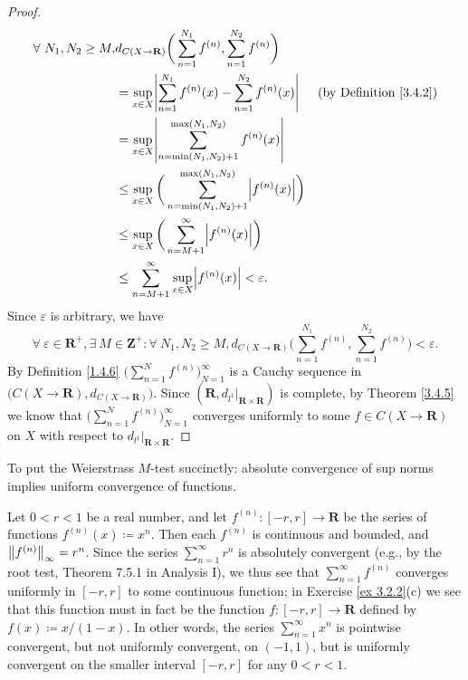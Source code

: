 \begin{proof}
\begin{align*}
        \forall\ N_1, N_2 \geq M, & d_{C(X \to \mathbf{R})}\bigg(\sum_{n = 1}^{N_1} f^{(n)}, \sum_{n = 1}^{N_2} f^{(n)}\bigg)                                             \\
                                  & = \sup_{x \in X} \abs*{\sum_{n = 1}^{N_1} f^{(n)}(x) - \sum_{n = 1}^{N_2} f^{(n)}(x)}            & \text{(by Definition \ref{3.4.2})} \\
                                  & = \sup_{x \in X} \abs*{\sum_{n = \min(N_1, N_2) + 1}^{\max(N_1, N_2)} f^{(n)}(x)}                                                     \\
                                  & \leq \sup_{x \in X} \bigg(\sum_{n = \min(N_1, N_2) + 1}^{\max(N_1, N_2)} \abs*{f^{(n)}(x)}\bigg)                                      \\
                                  & \leq \sup_{x \in X} \bigg(\sum_{n = M + 1}^\infty \abs*{f^{(n)}(x)}\bigg)                                                             \\
                                  & \leq \sum_{n = M + 1}^\infty \sup_{x \in X} \abs*{f^{(n)}(x)} < \varepsilon.
    \end{align*}
    Since \(\varepsilon\) is arbitrary, we have
    \[
        \forall\ \varepsilon \in \mathbf{R}^+, \exists\ M \in \mathbf{Z}^+ : \forall\ N_1, N_2 \geq M, d_{C(X \to \mathbf{R})}\bigg(\sum_{n = 1}^{N_1} f^{(n)}, \sum_{n = 1}^{N_2} f^{(n)}\bigg) < \varepsilon.
    \]
    By Definition \ref{1.4.6} \(\bigg(\sum_{n = 1}^N f^{(n)}\bigg)_{N = 1}^\infty\) is a Cauchy sequence in \(\big(C(X \to \mathbf{R}), d_{C(X \to \mathbf{R})}\big)\).
    Since \((\mathbf{R}, d_{l^1}|_{\mathbf{R} \times \mathbf{R}})\) is complete, by Theorem \ref{3.4.5} we know that \(\bigg(\sum_{n = 1}^N f^{(n)}\bigg)_{N = 1}^\infty\) converges uniformly to some \(f \in C(X \to \mathbf{R})\) on \(X\) with respect to \(d_{l^1}|_{\mathbf{R} \times \mathbf{R}}\).
\end{proof}

\begin{note}
    To put the Weierstrass \(M\)-test succinctly:
    absolute convergence of sup norms implies uniform convergence of functions.
\end{note}

\begin{example}\label{3.5.8}
    Let \(0 < r < 1\) be a real number, and let \(f^{(n)} : [-r, r] \to \mathbf{R}\) be the series of functions \(f^{(n)}(x) \coloneqq x^n\).
    Then each \(f^{(n)}\) is continuous and bounded, and \(\norm*{f^{(n)}}_\infty = r^n\).
    Since the series \(\sum_{n = 1}^\infty r^n\) is absolutely convergent (e.g., by the root test, Theorem 7.5.1 in Analysis I), we thus see that \(\sum_{n = 1}^\infty f^{(n)}\) converges uniformly in \([-r, r]\) to some continuous function;
    in Exercise \ref{ex 3.2.2}(c) we see that this function must in fact be the function \(f : [-r, r] \to \mathbf{R}\) defined by \(f(x) \coloneqq x / (1 - x)\).
    In other words, the series \(\sum_{n = 1}^\infty x^n\) is pointwise convergent, but not uniformly convergent, on \((-1, 1)\), but is uniformly convergent on the smaller interval \([-r, r]\) for any \(0 < r < 1\).
\end{example}

